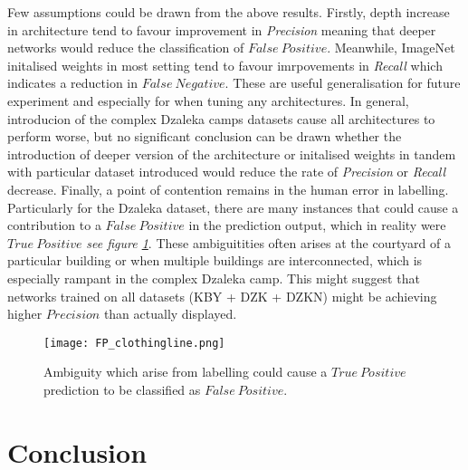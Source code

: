 \documentclass[11pt, a4paper, twoside]{report}
\begin{document}
Few assumptions could be drawn from the above results. Firstly, depth increase in architecture tend to favour improvement in \textit{Precision} meaning that deeper networks would reduce the classification of $False\ Positive$. Meanwhile, ImageNet initalised weights in most setting tend to favour imrpovements in \textit{Recall} which indicates a reduction in $False\ Negative$. These are useful generalisation for future experiment and especially for when tuning any architectures. In general, introducion of the complex Dzaleka camps datasets cause all architectures to perform worse, but no significant conclusion can be drawn whether the introduction of deeper version of the architecture or initalised weights in tandem with particular dataset introduced would reduce the rate of \textit{Precision} or \textit{Recall} decrease. Finally, a point of contention remains in the human error in labelling. Particularly for the Dzaleka dataset, there are many instances that could cause a contribution to a $False\ Positive$ in the prediction output, which in reality were $True\ Positive$ \textit{see figure \ref{fig:ambiguity}}. These ambiguitities often arises at the courtyard of a particular building or when multiple buildings are interconnected, which is especially rampant in the complex Dzaleka camp. This might suggest that networks trained on all datasets (KBY + DZK + DZKN) might be achieving higher $Precision$ than actually displayed.\\\par

\begin{figure}[H]
  \centering
  \texttt{[image: FP\_clothingline.png]}
  \caption{Ambiguity which arise from labelling could cause a $True\ Positive$ prediction to be classified as $False\ Positive$.}
  \label{fig:ambiguity}
\end{figure}

\newpage

\chapter{Conclusion}\label{Conclude}
\end{document}
